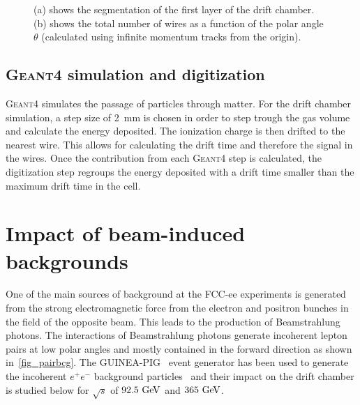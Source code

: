 \documentclass{article}
\begin{document}
\begin{figure}[!t]
\centering
{}
\hfil
{}
\caption{(a) shows the segmentation of the first layer of the drift chamber. (b) shows the total number of wires as a function of the polar angle $\theta$ (calculated using infinite momentum tracks from the origin).}
\label{fig_segmentation}
\end{figure}


\subsection{\textsc{Geant4} simulation and digitization}
\textsc{Geant4} simulates the passage of particles through matter. For the drift chamber simulation, a step size of 2~mm is chosen in order to step trough the gas volume and calculate the energy deposited. The ionization charge is then drifted to the nearest wire. This allows for calculating the drift time and therefore the signal in the wires. Once the contribution from each \textsc{Geant4} step is calculated, the digitization step regroups the energy deposited with a drift time smaller than the maximum drift time in the cell.

\section{Impact of beam-induced backgrounds}
One of the main sources of background at the FCC-ee experiments is generated from the strong electromagnetic force from the electron and positron bunches in the field of the opposite beam. This leads to the production of Beamstrahlung photons. The interactions of Beamstrahlung photons generate incoherent lepton pairs at low polar angles and mostly contained in the forward direction as shown in~\cref{fig_pairbcg}. The \textsc{GUINEA-PIG}~\cite{Schulte:382453} event generator has been used to generate the incoherent $e^+e^-$ background particles~\cite{Voutsinas:2017eca} and their impact on the drift chamber is studied below for $\sqrt{s}$ of $92.5\,\mathrm{\,Ge\kern -0.1em V}$ and $365\,\mathrm{\,Ge\kern -0.1em V}$.
\end{document}
